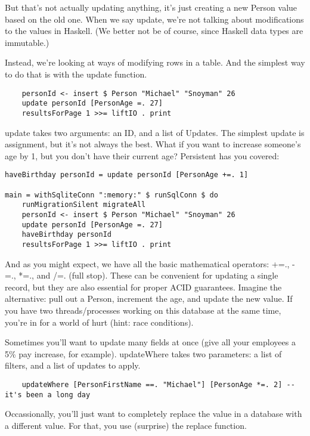 But that's not actually updating anything, it's just creating a new Person value based on the old one. When we say update, we're not talking about modifications to the values in Haskell. (We better not be of course, since Haskell data types are immutable.)

Instead, we're looking at ways of modifying rows in a table. And the simplest way to do that is with the update function.

\begin{lstlisting}
    personId <- insert $ Person "Michael" "Snoyman" 26
    update personId [PersonAge =. 27]
    resultsForPage 1 >>= liftIO . print
\end{lstlisting}

update takes two arguments: an ID, and a list of Updates. The simplest update is assignment, but it's not always the best. What if you want to increase someone's age by 1, but you don't have their current age? Persistent has you covered:

\begin{lstlisting}
haveBirthday personId = update personId [PersonAge +=. 1]

main = withSqliteConn ":memory:" $ runSqlConn $ do
    runMigrationSilent migrateAll
    personId <- insert $ Person "Michael" "Snoyman" 26
    update personId [PersonAge =. 27]
    haveBirthday personId
    resultsForPage 1 >>= liftIO . print
\end{lstlisting}

And as you might expect, we have all the basic mathematical operators: +=., -=., *=., and /=. (full stop). These can be convenient for updating a single record, but they are also essential for proper ACID guarantees. Imagine the alternative: pull out a Person, increment the age, and update the new value. If you have two threads/processes working on this database at the same time, you're in for a world of hurt (hint: race conditions).

Sometimes you'll want to update many fields at once (give all your employees a 5\% pay increase, for example). updateWhere takes two parameters: a list of filters, and a list of updates to apply.

\begin{lstlisting}
    updateWhere [PersonFirstName ==. "Michael"] [PersonAge *=. 2] -- it's been a long day
\end{lstlisting}

Occassionally, you'll just want to completely replace the value in a database with a different value. For that, you use (surprise) the replace function.

